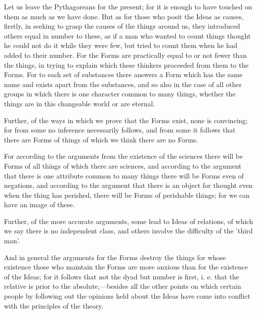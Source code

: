 
Let us leave the Pythagoreans for the present; for it is enough to have touched on them as much as we have done. But as for those who posit the Ideas as causes, firstly, in seeking to grasp the causes of the things around us, they introduced others equal in number to these, as if a man who wanted to count things thought he could not do it while they were few, but tried to count them when he had added to their number. For the Forms are practically equal to or not fewer than the things, in trying to explain which these thinkers proceeded from them to the Forms. For to each set of substances there answers a Form which has the same name and exists apart from the substances, and so also in the case of all other groups in which there is one character common to many things, whether the things are in this changeable world or are eternal.

Further, of the ways in which we prove that the Forms exist, none is convincing; for from some no inference necessarily follows, and from some it follows that there are Forms of things of which we think there are no Forms.

For according to the arguments from the existence of the sciences there will be Forms of all things of which there are sciences, and according to the argument that there is one attribute common to many things there will be Forms even of negations, and according to the argument that there is an object for thought even when the thing has perished, there will be Forms of perishable things; for we can have an image of these.

Further, of the more accurate arguments, some lead to Ideas of relations, of which we say there is no independent class, and others involve the difficulty of the 'third man'.

And in general the arguments for the Forms destroy the things for whose existence those who maintain the Forms are more anxious than for the existence of the Ideas; for it follows that not the dyad but number is first, i. e. that the relative is prior to the absolute,—besides all the other points on which certain people by following out the opinions held about the Ideas have come into conflict with the principles of the theory.

